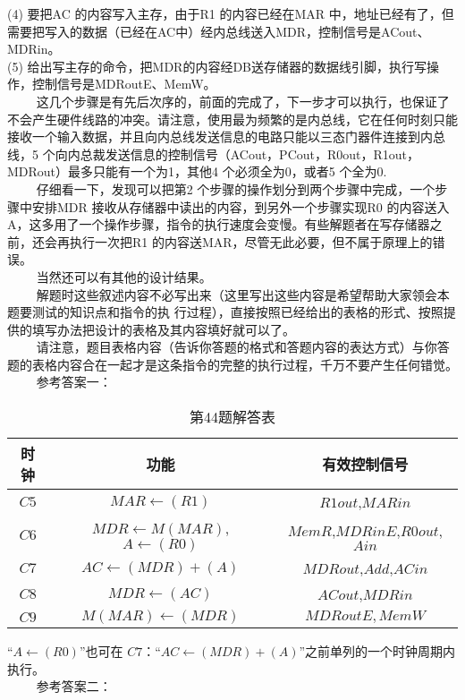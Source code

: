 (4) 要把AC 的内容写入主存，由于R1 的内容已经在MAR 中，地址已经有了，但需要把写入的数据（已经在AC中）经内总线送入MDR，控制信号是ACout、MDRin。 \\
(5) 给出写主存的命令，把MDR的内容经DB送存储器的数据线引脚，执行写操作，控制信号是MDRoutE、MemW。 \\
$\qquad$ 这几个步骤是有先后次序的，前面的完成了，下一步才可以执行，也保证了不会产生硬件线路的冲突。请注意，使用最为频繁的是内总线，它在任何时刻只能接收一个输入数据，并且向内总线发送信息的电路只能以三态门器件连接到内总线，5 个向内总裁发送信息的控制信号（ACout，PCout，R0out，R1out，MDRout）最多只能有一个为1，其他4 个必须全为0，或者5 个全为0. \\
$\qquad$ 仔细看一下，发现可以把第2 个步骤的操作划分到两个步骤中完成，一个步骤中安排MDR 接收从存储器中读出的内容，到另外一个步骤实现R0 的内容送入A，这多用了一个操作步骤，指令的执行速度会变慢。有些解题者在写存储器之前，还会再执行一次把R1 的内容送MAR，尽管无此必要，但不属于原理上的错误。 \\
$\qquad$ 当然还可以有其他的设计结果。 \\
$\qquad$ 解题时这些叙述内容不必写出来（这里写出这些内容是希望帮助大家领会本题要测试的知识点和指令的执
行过程），直接按照已经给出的表格的形式、按照提供的填写办法把设计的表格及其内容填好就可以了。 \\
$\qquad$ 请注意，题目表格内容（告诉你答题的格式和答题内容的表达方式）与你答题的表格内容合在一起才是这条指令的完整的执行过程，千万不要产生任何错觉。 \\
$\qquad$ 参考答案一：
\begin{table}[ht]
\centering
\caption{第44题解答表}\label{tab_CSN09_6}
\begin{tabular}{|c|c|c|}
\hline
时钟 & 功能 & 有效控制信号 \\
\hline
$C5$ & $MAR\leftarrow(R1)$ & $R1out$,$MARin$ \\
\hline
$C6$ & $MDR\leftarrow M(MAR)$, $A\leftarrow(R0)$ & $MemR$,$MDRinE$,$R0out$,$Ain$ \\
\hline
$C7$ & $AC\leftarrow(MDR)+(A)$ & $MDRout$,$Add$,$ACin$ \\
\hline
$C8$ & $MDR\leftarrow(AC)$ & $ACout$,$MDRin$ \\
\hline
$C9$ & $M(MAR)\leftarrow(MDR)$ & $MDRoutE,MemW$ \\
\hline
\end{tabular}
\end{table}
“$A\leftarrow(R0)$”也可在 $C7$：“$AC\leftarrow(MDR)+(A)$”之前单列的一个时钟周期内执行。 \\
$\qquad$ 参考答案二： \\
